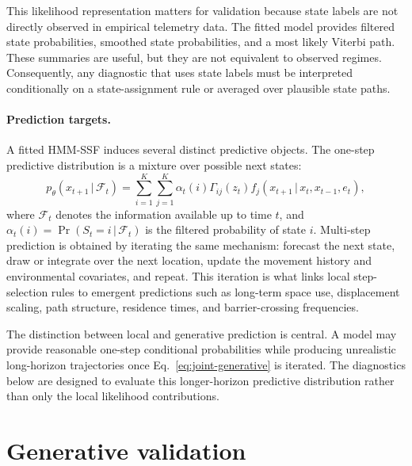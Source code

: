 \documentclass[11pt]{article}
\newcommand{\given}{\,\vert\,}
\begin{document}
This likelihood representation matters for validation because state labels are
not directly observed in empirical telemetry data. The fitted model provides
filtered state probabilities, smoothed state probabilities, and a most likely
Viterbi path. These summaries are useful, but they are not equivalent to
observed regimes. Consequently, any diagnostic that uses state labels must be
interpreted conditionally on a state-assignment rule or averaged over plausible
state paths.

\paragraph{Prediction targets.}

A fitted HMM-SSF induces several distinct predictive objects. The one-step
predictive distribution is a mixture over possible next states:
\begin{equation}
  p_{\theta}(x_{t+1} \given \mathcal{F}_t)
  =
  \sum_{i=1}^{K}\sum_{j=1}^{K}
  \alpha_t(i)\Gamma_{ij}(z_t)
  f_j(x_{t+1} \given x_t,x_{t-1},e_t),
  \label{eq:one-step-predictive}
\end{equation}
where $\mathcal{F}_t$ denotes the information available up to time $t$, and
$\alpha_t(i)=\Pr(S_t=i\given \mathcal{F}_t)$ is the filtered probability of
state $i$. Multi-step prediction is obtained by iterating the same mechanism:
forecast the next state, draw or integrate over the next location, update the
movement history and environmental covariates, and repeat. This iteration is
what links local step-selection rules to emergent predictions such as
long-term space use, displacement scaling, path structure, residence times,
and barrier-crossing frequencies.

The distinction between local and generative prediction is central. A model may
provide reasonable one-step conditional probabilities while producing
unrealistic long-horizon trajectories once Eq.~\eqref{eq:joint-generative} is
iterated. The diagnostics below are designed to evaluate this longer-horizon
predictive distribution rather than only the local likelihood contributions.

\section{Generative validation}
\end{document}

